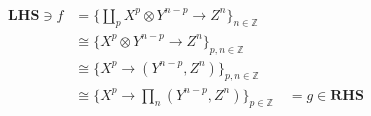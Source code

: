 \documentclass[preview]{standalone}
\begin{document}
\begin{align*}
\mathbf{LHS} \ni f & = \{\coprod_p X^p \otimes Y^{n-p} \to Z^n\}_{n \in \mathbb Z}\\
& \cong \{X^p \otimes Y^{n-p} \to Z^n\}_{p, n \in\mathbb Z}\\
& \cong \{X^p \to (Y^{n-p} , Z^n)\}_{p, n \in\mathbb Z}\\
& \cong \{X^p \to \prod_n (Y^{n-p} , Z^n)\}_{p \in\mathbb Z}\quad = g \in\mathbf{RHS}
\end{align*}
\end{document}
